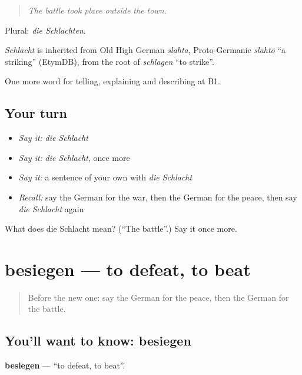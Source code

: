 \begin{quote}
\emph{The battle took place outside the town.}
\end{quote}

Plural: \emph{die Schlachten}.

\begin{cousinweb}
\emph{Schlacht} is inherited from Old High German \emph{slahta}, Proto-Germanic \emph{slahtō} \textquotedblleft{}a striking\textquotedblright{} (EtymDB), from the root of \emph{schlagen} \textquotedblleft{}to strike\textquotedblright{}.
\end{cousinweb}

\begin{grammarlens}[title={What you've built}]
One more word for telling, explaining and describing at B1.
\end{grammarlens}

\subsection*{Your turn}
\begin{itemize}
\raggedright
  \item \emph{Say it:} \emph{die Schlacht}
  \item \emph{Say it:} \emph{die Schlacht}, once more
  \item \emph{Say it:} a sentence of your own with \emph{die Schlacht}
  \item \emph{Recall:} say the German for the war, then the German for the peace, then say \emph{die Schlacht} again
\end{itemize}

\begin{tcolorbox}[breakable,colback=teal!4,colframe=teal!35!black,title={Before you move on}]
What does die Schlacht mean? (\textquotedblleft{}The battle\textquotedblright{}.) Say it once more.
\end{tcolorbox}
\section[besiegen]{besiegen — to defeat, to beat}

\label{lesson:GE-C318-besiegen}



\begin{quote}
Before the new one: say the German for the peace, then the German for the battle.
\end{quote}

\subsection*{You'll want to know: besiegen}
\textbf{besiegen} — \textquotedblleft{}to defeat, to beat\textquotedblright{}.

